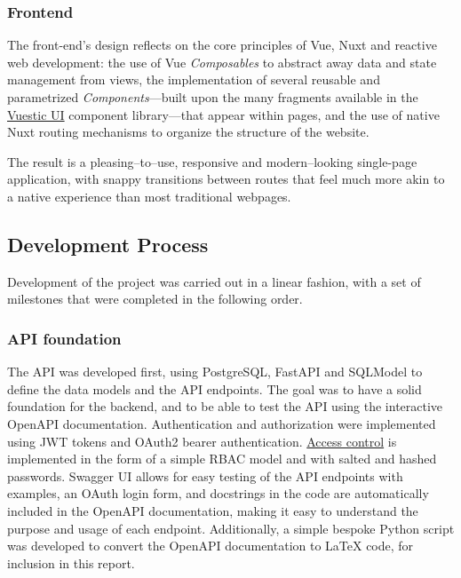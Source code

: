 \documentclass[11pt,italian,a4paper]{article}
\newcommand{\todo}[1]{\noindent {\Huge \color{orange} TODO -- #1}}
\begin{document}
\subsubsection{Frontend}

The front-end's design reflects on the core principles of Vue, Nuxt and reactive web development: the use of Vue \textit{Composables} to abstract away data and state management from views, the implementation of several reusable and parametrized \textit{Components}---built upon the many fragments available in the \href{https://ui.vuestic.dev/}{Vuestic UI} component library---that appear within pages, and the use of native Nuxt routing mechanisms to organize the structure of the website.

The result is a pleasing--to--use, responsive and modern--looking single-page application, with snappy transitions between routes that feel much more akin to a native experience than most traditional webpages.



\subsection{Development Process}


Development of the project was carried out in a linear fashion, with a set of milestones that were completed in the following order.

\subsubsection{API foundation}
The API was developed first, using PostgreSQL, FastAPI and SQLModel to define the data models and the API endpoints. The goal was to have a solid foundation for the backend, and to be able to test the API using the interactive OpenAPI documentation. Authentication and authorization were implemented using JWT tokens and OAuth2 bearer authentication. \hyperref[sec:auth]{Access control} is implemented in the form of a simple RBAC model and with salted and hashed passwords. Swagger UI allows for easy testing of the API endpoints with examples, an OAuth login form, and docstrings in the code are automatically included in the OpenAPI documentation, making it easy to understand the purpose and usage of each endpoint. Additionally, a simple bespoke Python script was developed to convert the OpenAPI documentation to \LaTeX{} code, for inclusion in this report.
\end{document}
